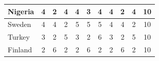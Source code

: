 \documentclass[12pt]{article}  %
\begin{document}
\begin{subappendices}
\begin{longtable}{|l|c|c|c|c|c|c|c|c|c|c|}
	\hline
	Nigeria                                                        & 4                                                                      & 2                                                                      & 4                                                                      & 4                                                                      & 3                                                                      & 4                                                                      & 4                         & 2                           & 4                           & 10                          \\ 
	\hline
	Sweden                                                         & 4                                                                      & 4                                                                      & 2                                                                      & 5                                                                      & 5                                                                      & 5                                                                      & 4                         & 4                           & 2                           & 10                          \\ 
	\hline
	Turkey                                                         & 3                                                                      & 2                                                                      & 5                                                                      & 3                                                                      & 2                                                                      & 6                                                                      & 3                         & 2                           & 5                           & 10                          \\ 
	\hline
	Finland                                                        & 2                                                                      & 6                                                                      & 2                                                                      & 2                                                                      & 6                                                                      & 2                                                                      & 2                         & 6                           & 2                           & 10                          \\ 

\end{longtable}
\end{subappendices}
\end{document}
